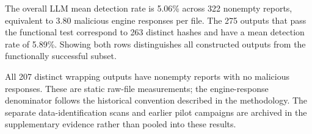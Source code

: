The overall LLM mean detection rate is 5.06\% across 322 nonempty reports,
equivalent to 3.80 malicious engine responses per file. The 275 outputs
that pass the functional test correspond to 263 distinct hashes and have
a mean detection rate of 5.89\%. Showing both rows distinguishes all
constructed outputs from the functionally successful subset.

All 207 distinct wrapping outputs have nonempty reports with no malicious
responses. These are static raw-file measurements; the engine-response
denominator follows the historical convention described in the methodology.
The separate data-identification scans and earlier pilot campaigns are
archived in the supplementary evidence rather than pooled into these results.
